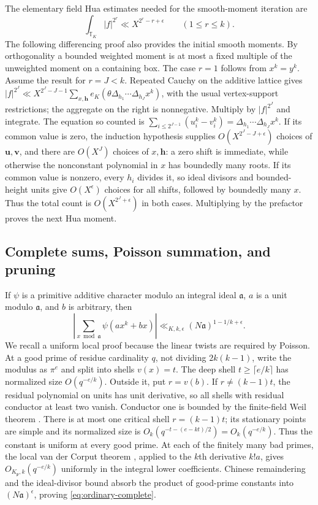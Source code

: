\documentclass[11pt]{amsart}
\theoremstyle{definition}
\numberwithin{equation}{section}
\begin{document}
The elementary field Hua estimates needed for the smooth-moment iteration are
\begin{equation}\label{eq:ordinary-Hua}
 \int_{\mathbb T_K}|f|^{2^r}\ll X^{2^r-r+\epsilon}
       \qquad(1\le r\le k).
\end{equation}
The following differencing proof also provides the initial smooth moments.
By orthogonality a bounded weighted moment is at most a fixed multiple of
the unweighted moment on a containing box.
The case $r=1$ follows from $x^k=y^k$.
Assume the result for $r=J<k$.
Repeated Cauchy on the additive lattice gives
$|f|^{2^J}\ll X^{2^J-J-1}\sum_{x,\mathbf h}
e_K(\theta\Delta_{h_1}\cdots\Delta_{h_J}x^k)$, with the usual vertex-support
restrictions; the aggregate on the right is nonnegative.
Multiply by $|f|^{2^J}$ and integrate.
The equation so counted is
$\sum_{i\le2^{J-1}}(u_i^k-v_i^k)=\Delta_{h_1}\cdots\Delta_{h_J}x^k$.
If its common value is zero, the induction hypothesis supplies
$O(X^{2^J-J+\epsilon})$ choices of $\mathbf u,\mathbf v$, and there are
$O(X^J)$ choices of $x,\mathbf h$: a zero shift is immediate, while otherwise
the nonconstant polynomial in $x$ has boundedly many roots.
If its common value is nonzero, every $h_i$ divides it, so ideal divisors and
bounded-height units give $O(X^\epsilon)$ choices for all shifts, followed by
boundedly many $x$.  Thus the total count is $O(X^{2^J+\epsilon})$ in both
cases.  Multiplying by the prefactor proves the next Hua moment.

\subsection{Complete sums, Poisson summation, and pruning}

If $\psi$ is a primitive additive character modulo an integral ideal
$\mathfrak a$, $a$ is a unit modulo $\mathfrak a$, and $b$ is arbitrary, then
\begin{equation}\label{eq:ordinary-complete}
 \left|\sum_{x\bmod\mathfrak a}\psi(ax^k+bx)\right|
       \ll_{K,k,\epsilon}(N\mathfrak a)^{1-1/k+\epsilon}.
\end{equation}
We recall a uniform local proof because the linear twists are required by Poisson.
At a good prime of residue cardinality $q$, not dividing $2k(k-1)$,
write the modulus as $\pi^e$ and split into shells $v(x)=t$.
The deep shell $t\ge\lceil e/k\rceil$ has normalized size $O(q^{-e/k})$.
Outside it, put $r=v(b)$.  If $r\ne(k-1)t$, the residual polynomial on units
has unit derivative, so all shells with residual conductor at least two vanish.
Conductor one is bounded by the finite-field Weil theorem
\cite{Weil1948}.
There is at most one critical shell $r=(k-1)t$; its stationary points are
simple and its normalized size is
$O_k(q^{-t-(e-kt)/2})=O_k(q^{-e/k})$.
Thus the constant is uniform at every good prime.
At each of the finitely many bad primes, the local van der Corput theorem
\cite[Proposition~3.3]{Cluckers2011}, applied to the $k$th derivative $k!a$,
gives $O_{K_\mathfrak p,k}(q^{-e/k})$ uniformly in the integral lower coefficients.
Chinese remaindering and the ideal-divisor bound absorb the product of
good-prime constants into $(N\mathfrak a)^\epsilon$, proving
\eqref{eq:ordinary-complete}.
\end{document}

